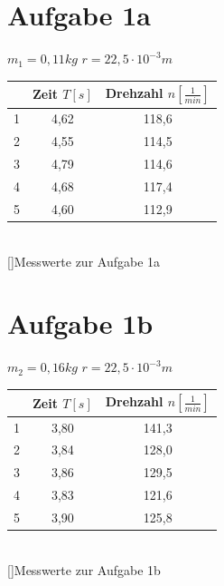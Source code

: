\documentclass[12pt,a4paper,]{scrreprt}
\begin{document}
			\section{Aufgabe 1a}
            $m_1 = 0,11kg$ $r=22,5 \cdot 10^{-3} m$ \\
            \begin{center}
            	\begin{tabular}{c|cc}
                	&	Zeit $T [s]$ & Drehzahl $n [\frac{1}{min}]$ \\ \hline \hline
                    1	&	4,62	&118,6 \\
                    2	&	4,55	&114,5 \\
                    3   &	4,79	&114,6 \\
                    4   &	4,68	&117,4 \\
                    5   &	4,60	&112,9 
   		     	\end{tabular}\\
                []{Messwerte zur Aufgabe 1a}
                \end{center}
            \section{Aufgabe 1b}
             $m_2 = 0,16kg$ $r=22,5 \cdot 10^{-3} m$ \\
             \begin{center}
        	    \begin{tabular}{c|cc}
                    &	Zeit $T [s]$ & Drehzahl $n [\frac{1}{min}]$ \\ \hline \hline
                    1&3,80	&141,3\\
                    2&3,84	&128,0\\
                    3&3,86	&129,5\\
                    4&3,83	&121,6\\
                    5&3,90	&125,8 \\
                \end{tabular}\\
                 []{Messwerte zur Aufgabe 1b}
                \end{center}
\end{document}
